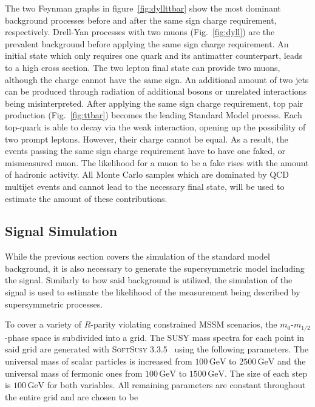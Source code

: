 The two Feynman graphs in figure~\ref{fig:dyllttbar} show the most dominant background processes before and after the same sign charge requirement, respectively. Drell-Yan processes with two muons (Fig.~\ref{fig:dyll}) are the prevalent background before applying the same sign charge requirement. An initial state which only requires one quark and its antimatter counterpart, leads to a high cross section. The two lepton final state can provide two muons, although the charge cannot have the same sign. An additional amount of two jets can be produced through radiation of additional bosons or unrelated interactions being misinterpreted. After applying the same sign charge requirement, top pair production (Fig.~\ref{fig:ttbar}) becomes the leading Standard Model process. Each top-quark is able to decay via the weak interaction, opening up the possibility of two prompt leptons. However, their charge cannot be equal. As a result, the events passing the same sign charge requirement have to have one faked, or mismeasured muon. The likelihood for a muon to be a fake rises with the amount of hadronic activity. All Monte Carlo samples which are dominated by QCD multijet events and cannot lead to the necessary final state, will be used to estimate the amount of these contributions.


\subsection{Signal Simulation}
\label{sec:signal-sim}

While the previous section covers the simulation of the standard model background, it is also necessary to generate the supersymmetric model including the signal. Similarly to how said background is utilized, the simulation of the signal is used to estimate the likelihood of the measurement being described by supersymmetric processes.

To cover a variety of $R$-parity violating constrained MSSM scenarios, the $m_0$-$m_{1/2}$-phase space is subdivided into a grid. The SUSY mass spectra for each point in said grid are generated with \textsc{SoftSusy 3.3.5}~\cite{softsusy,sonnegueth} using the following parameters. The universal mass of scalar particles is increased from $100\,\text{GeV}$ to $2500\,\text{GeV}$ and the universal mass of fermonic ones from $100\,\text{GeV}$ to $1500\,\text{GeV}$. The size of each step is $100\,\text{GeV}$ for both variables. All remaining parameters are constant throughout the entire grid and are chosen to be


